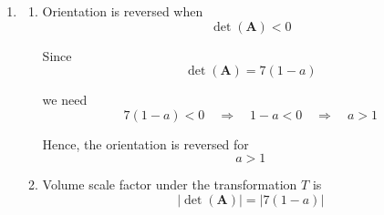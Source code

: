\documentclass[leqno]{article}
\begin{document}
\begin{enumerate}[
  label=\textbf{\arabic*.},
  leftmargin=*,
  topsep=0pt,
  partopsep=0pt,
  parsep=0pt
]
\begin{djsSolution}
\begin{enumerate}[label=\textbf{(\alph*)}]
\begin{enumerate}[label=(\roman*)]
Hence, for $a\neq 1$, the solution is
\[
x=2,\quad y=1,\quad z=0
\]

    \item $\mathbf{A}$ is singular when
\[
7(1-a)=0\quad\Longrightarrow\quad a=1
\]

In this case the equations are
\begin{align*}
3x+2y+z&=8 \\
x+3y&=5 \\
2x-y+z&=3
\end{align*}

Now add the second and third equations:
\begin{align*}
(x+3y)+(2x-y+z)&=5+3 \\
3x+2y+z&=8
\end{align*}

This is exactly the first equation.

So the first plane contains the line of intersection of the second and third planes.

Also, the second and third planes are not parallel, since their normal vectors
\[
\begin{pmatrix}1\\3\\0\end{pmatrix}\quad \text{and} \quad \begin{pmatrix}2\\-1\\1\end{pmatrix}
\]

are not scalar multiples of each other.

Therefore the second and third planes intersect in a line, and the first plane also contains this same line.

Hence the configuration is: the three distinct planes all share a common line, so form a \textbf{sheaf}.
  \end{enumerate}

  \item \begin{enumerate}[label=(\roman*)]
    \item Orientation is reversed when
\[
\det(\mathbf{A})<0
\]

Since
\[
\det(\mathbf{A})=7(1-a)
\]

we need
\[
7(1-a)<0\quad\Longrightarrow\quad 1-a<0\quad\Longrightarrow\quad a>1
\]

Hence, the orientation is reversed for
\[
a>1
\]

    \item Volume scale factor under the transformation $T$ is
\[
|\det(\mathbf{A})|=|7(1-a)|
\]


\end{enumerate}
\end{enumerate}
\end{djsSolution}
\end{enumerate}
\end{document}
